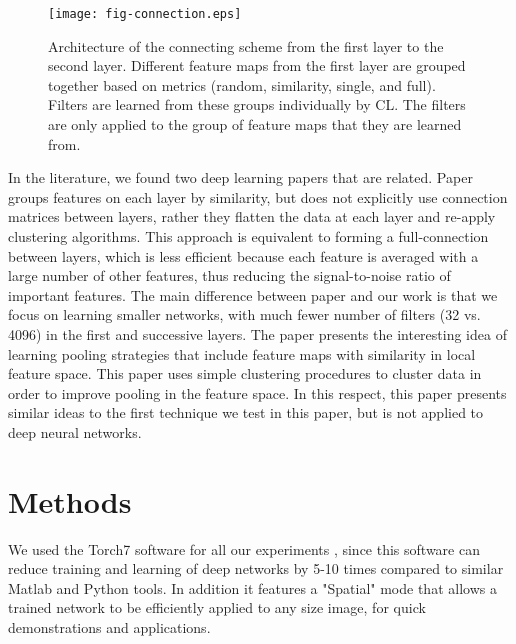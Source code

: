 \documentclass{article} %
\begin{document}
\begin{figure}
\texttt{[image: fig-connection.eps]}
\caption{Architecture of the connecting scheme from the first layer to the second layer. 
Different feature maps from the first layer are grouped together based on metrics (random, similarity, single, and full). 
Filters are learned from these groups individually by CL. The filters are only applied to the group of feature maps that they are learned from.}
\label{fig-learnlayers}
\end{figure}

In the literature, we found two deep learning papers that are related. 
Paper \cite{coates2012learning} groups features on each layer by similarity, but does not explicitly use connection matrices between layers, 
rather they flatten the data at each layer and re-apply clustering algorithms. This approach is equivalent to forming a full-connection between layers, 
which is less efficient because each feature is averaged with a large number of other features, thus reducing the signal-to-noise ratio of important features.
The main difference between paper \cite{coates2012learning} and our work is that we focus on learning smaller networks,
with much fewer number of filters (32 vs. 4096) in the first and successive layers. 
The paper \cite{boureau_2011} presents the interesting idea of learning pooling strategies that include feature maps with similarity in local feature space. 
This paper uses simple clustering procedures to cluster data in order to improve pooling in the feature space. 
In this respect, this paper presents similar ideas to the first technique we test in this paper, but is not applied to deep neural networks.



\section{Methods}
\label{sec-methods}


We used the Torch7 software for all our experiments \cite{collobert_torch7_2011}, since this software can reduce training and learning of deep networks
by 5-10 times compared to similar Matlab and Python tools.
In addition it features a "Spatial" mode that allows a trained network to be efficiently applied to any size image, for quick demonstrations and applications.
\end{document}
